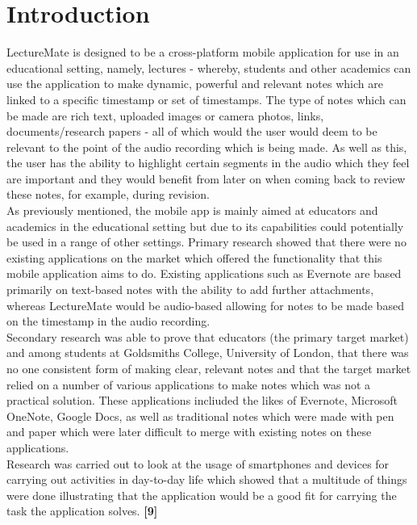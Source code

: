 \documentclass[oneside]{report}
\begin{document}
\chapter{Introduction}
LectureMate is designed to be a cross-platform mobile application for use in an educational setting, namely, lectures - whereby, students and other academics can use the application to make dynamic, powerful and relevant notes which are linked to a specific timestamp or set of timestamps. The type of notes which can be made are rich text, uploaded images or camera photos, links, documents/research papers - all of which would the user would deem to be relevant to the point of the audio recording which is being made. As well as this, the user has the ability to highlight certain segments in the audio which they feel are important and they would benefit from later on when coming back to review these notes, for example, during revision.\\

As previously mentioned, the mobile app is mainly aimed at educators and academics in the educational setting but due to its capabilities could potentially be used in a range of other settings. Primary research showed that there were no existing applications on the market which offered the functionality that this mobile application aims to do. Existing applications such as Evernote are based primarily on text-based notes with the ability to add further attachments, whereas LectureMate would be audio-based allowing for notes to be made based on the timestamp in the audio recording.\\

Secondary research was able to prove that educators (the primary target market) and among students at Goldsmiths College, University of London, that there was no one consistent form of making clear, relevant notes and that the target market relied on a number of various applications to make notes which was not a practical solution. These applications incliuded the likes of Evernote, Microsoft OneNote, Google Docs, as well as traditional notes which were made with pen and paper which were later difficult to merge with existing notes on these applications.\\

Research was carried out to look at the usage of smartphones and devices for carrying out activities in day-to-day life which showed that a multitude of things were done illustrating that the application would be a good fit for carrying the task the application solves. \textbf{[9]}\\
\end{document}
